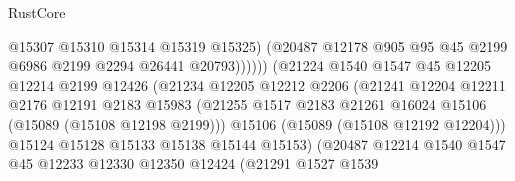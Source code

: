 \begin{lexlean}{RustCore}
\begin{coremodule}
                                        @15307
                                        @15310
                                        @15314
                                        @15319
                                        @15325)
                                      (@20487
                                        @12178
                                        @905
                                        @95
                                        @45
                                        @2199
                                        @6986
                                        @2199
                                        @2294
                                        @26441
                                        @20793))))))
                            (@21224
                              @1540
                              @1547
                              @45
                              @12205
                              @12214
                              @2199
                              @12426
                              (@21234
                                @12205
                                @12212
                                @2206
                                (@21241
                                  @12204
                                  @12211
                                  @2176
                                  @12191
                                  @2183
                                  @15983
                                  (@21255
                                    @1517
                                    @2183
                                    @21261
                                    @16024
                                    @15106
                                    (@15089 (@15108 @12198 @2199)))
                                  @15106
                                  (@15089 (@15108 @12192 @12204)))
                                @15124
                                @15128
                                @15133
                                @15138
                                @15144
                                @15153)
                              (@20487
                                @12214
                                @1540
                                @1547
                                @45
                                @12233
                                @12330
                                @12350
                                @12424
                                (@21291
                                  @1527
                                  @1539

\end{coremodule}
\end{lexlean}

